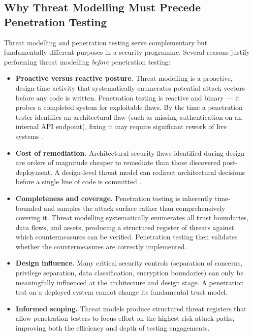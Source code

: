\documentclass[12pt,a4paper]{article}
\begin{document}
\subsection{Why Threat Modelling Must Precede Penetration Testing}

Threat modelling and penetration testing serve complementary but fundamentally different
purposes in a security programme. Several reasons justify performing threat modelling
\emph{before} penetration testing:

\begin{itemize}
  \item \textbf{Proactive versus reactive posture.} Threat modelling is a proactive,
    design-time activity that systematically enumerates potential attack vectors before
    any code is written. Penetration testing is reactive and binary --- it probes a
    completed system for exploitable flaws. By the time a penetration tester identifies
    an architectural flaw (such as missing authentication on an internal API endpoint),
    fixing it may require significant rework of live systems \citep{howard2006}.

  \item \textbf{Cost of remediation.} Architectural security flaws identified during
    design are orders of magnitude cheaper to remediate than those discovered post-
    deployment. A design-level threat model can redirect architectural decisions before
    a single line of code is committed \citep{ibm2012}.

  \item \textbf{Completeness and coverage.} Penetration testing is inherently time-
    bounded and samples the attack surface rather than comprehensively covering it.
    Threat modelling systematically enumerates all trust boundaries, data flows, and
    assets, producing a structured register of threats against which countermeasures can
    be verified. Penetration testing then validates whether the countermeasures are
    correctly implemented.

  \item \textbf{Design influence.} Many critical security controls (separation of
    concerns, privilege separation, data classification, encryption boundaries) can only
    be meaningfully influenced at the architecture and design stage. A penetration test
    on a deployed system cannot change its fundamental trust model.

  \item \textbf{Informed scoping.} Threat models produce structured threat registers
    that allow penetration testers to focus effort on the highest-risk attack paths,
    improving both the efficiency and depth of testing engagements.
\end{itemize}
\end{document}

